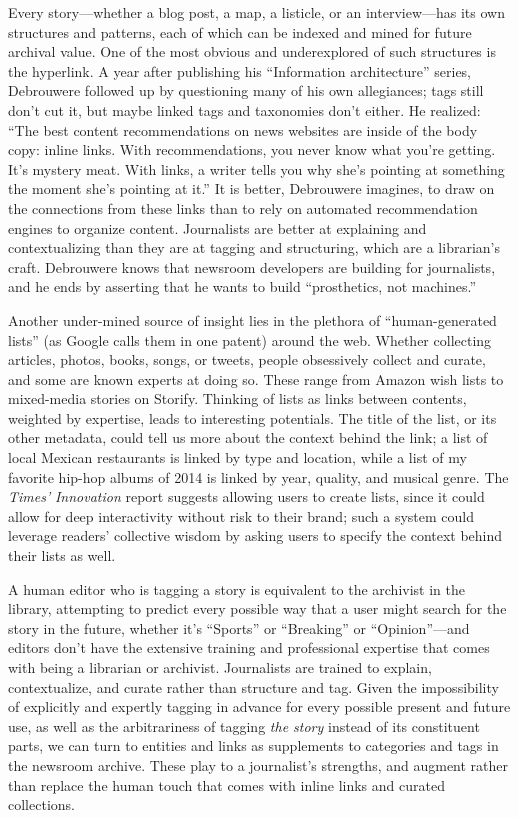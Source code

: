 Every story---whether a blog post, a map, a listicle, or an interview---has its own structures and patterns, each of which can be indexed and mined for future archival value. One of the most obvious and underexplored of such structures is the hyperlink. A year after publishing his ``Information architecture'' series, Debrouwere followed up by questioning many of his own allegiances; tags still don't cut it, but maybe linked tags and taxonomies don't either. He realized: ``The best content recommendations on news websites are inside of the body copy: inline links. With recommendations, you never know what you're getting. It's mystery meat. With links, a writer tells you why she's pointing at something the moment she's pointing at it.''\autocite{debrouwere_taxonomies_2011} It is better, Debrouwere imagines, to draw on the connections from these links than to rely on automated recommendation engines to organize content. Journalists are better at explaining and contextualizing than they are at tagging and structuring, which are a librarian's craft. Debrouwere knows that newsroom developers are building for journalists, and he ends by asserting that he wants to build ``prosthetics, not machines.''

Another under-mined source of insight lies in the plethora of ``human-generated lists'' (as Google calls them in one patent) around the web.\autocite{franks_discovering_2012} Whether collecting articles, photos, books, songs, or tweets, people obsessively collect and curate, and some are known experts at doing so. These range from Amazon wish lists to mixed-media stories on Storify. Thinking of lists as links between contents, weighted by expertise, leads to interesting potentials. The title of the list, or its other metadata, could tell us more about the context behind the link; a list of local Mexican restaurants is linked by type and location, while a list of my favorite hip-hop albums of 2014 is linked by year, quality, and musical genre. The \emph{Times'} \emph{Innovation} report suggests allowing users to create lists, since it could allow for deep interactivity without risk to their brand; such a system could leverage readers' collective wisdom by asking users to specify the context behind their lists as well.

A human editor who is tagging a story is equivalent to the archivist in the library, attempting to predict every possible way that a user might search for the story in the future, whether it's ``Sports'' or ``Breaking'' or ``Opinion''---and editors don't have the extensive training and professional expertise that comes with being a librarian or archivist. Journalists are trained to explain, contextualize, and curate rather than structure and tag. Given the impossibility of explicitly and expertly tagging in advance for every possible present and future use, as well as the arbitrariness of tagging \emph{the story} instead of its constituent parts, we can turn to entities and links as supplements to categories and tags in the newsroom archive. These play to a journalist's strengths, and augment rather than replace the human touch that comes with inline links and curated collections.

